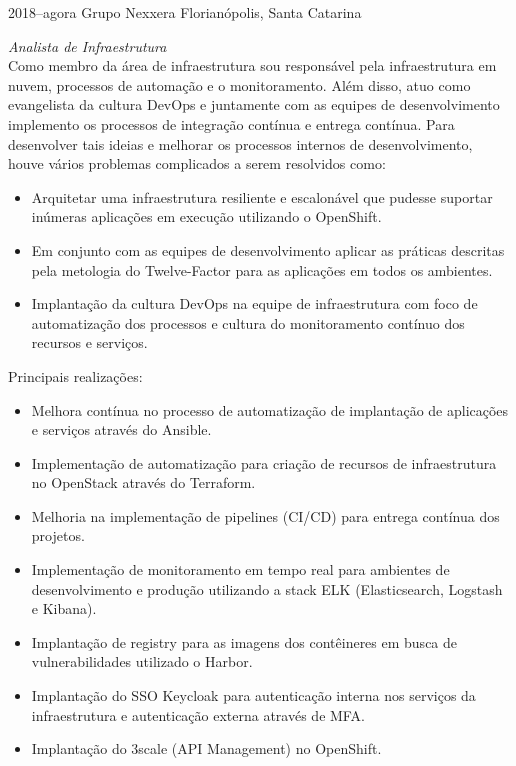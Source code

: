 \documentclass[]{friggeri-cv} %
\begin{document}
\begin{entrylist}
\entry
{2018--agora}
{Grupo Nexxera}
{Florianópolis, Santa Catarina}
{\emph{Analista de Infraestrutura} \\

    Como membro da área de infraestrutura sou responsável pela infraestrutura em nuvem,
    processos de automação e o monitoramento. Além disso, atuo como evangelista da cultura DevOps e juntamente com as equipes de desenvolvimento implemento os processos de integração contínua e entrega contínua. Para desenvolver tais ideias e melhorar os processos internos de desenvolvimento, houve vários problemas complicados a serem resolvidos como:

\begin{itemize}
    \item Arquitetar uma infraestrutura resiliente e escalonável que pudesse suportar inúmeras aplicações em execução utilizando o OpenShift.
    \item Em conjunto com as equipes de desenvolvimento aplicar as práticas descritas pela metologia do Twelve-Factor para as aplicações em todos os ambientes.
    \item Implantação da cultura DevOps na equipe de infraestrutura com foco de automatização dos processos e cultura do monitoramento contínuo dos recursos e serviços.
\end{itemize}

Principais realizações:\\

\begin{itemize}
    \item Melhora contínua no processo de automatização de implantação de aplicações e serviços através do Ansible.
    \item Implementação de automatização para criação de recursos de infraestrutura no OpenStack através do Terraform.
    \item Melhoria na implementação de pipelines (CI/CD) para entrega contínua dos projetos.
    \item Implementação de monitoramento em tempo real para ambientes de desenvolvimento e produção utilizando a stack ELK (Elasticsearch, Logstash e Kibana).
    \item Implantação de registry para as imagens dos contêineres em busca de vulnerabilidades utilizado o Harbor.
    \item Implantação do SSO Keycloak para autenticação interna nos serviços da infraestrutura e autenticação externa através de MFA.
    \item Implantação do 3scale (API Management) no OpenShift.
\end{itemize}

}
\end{entrylist}
\end{document}
